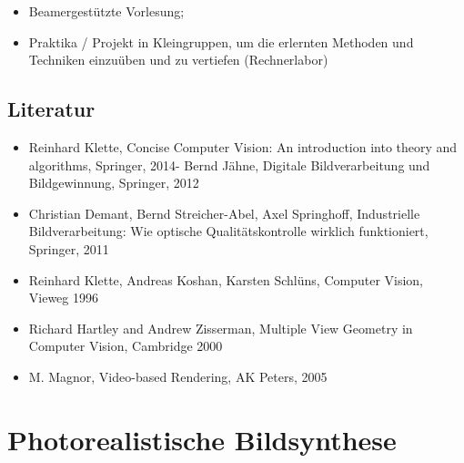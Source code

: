 \begin{itemize}
\tightlist
\item
  Beamergestützte Vorlesung;
\item
  Praktika / Projekt in Kleingruppen, um die erlernten Methoden und
  Techniken einzuüben und zu vertiefen (Rechnerlabor)
\end{itemize}

\section*{Literatur\label{/mi-2017/modulbeschreibungen-master/MA_VC_Modul_BildbasierteComputergrafik}}\label{literaturpathlabelmi-2017modulbeschreibungen-mastermaux5fvcux5fmodulux5fbildbasiertecomputergrafik}

\begin{itemize}
\tightlist
\item
  Reinhard Klette, Concise Computer Vision: An introduction into theory
  and algorithms, Springer, 2014- Bernd Jähne, Digitale Bildverarbeitung
  und Bildgewinnung, Springer, 2012
\item
  Christian Demant, Bernd Streicher-Abel, Axel Springhoff, Industrielle
  Bildverarbeitung: Wie optische Qualitätskontrolle wirklich
  funktioniert, Springer, 2011
\item
  Reinhard Klette, Andreas Koshan, Karsten Schlüns, Computer Vision,
  Vieweg 1996
\item
  Richard Hartley and Andrew Zisserman, Multiple View Geometry in
  Computer Vision, Cambridge 2000
\item
  M. Magnor, Video-based Rendering, AK Peters, 2005
\end{itemize}

\chapter{Photorealistische
Bildsynthese\label{/mi-2017/modulbeschreibungen-master/MA_VC_Modul_PhotorealistischeBildsynthese}}\label{photorealistische-bildsynthesepathlabelmi-2017modulbeschreibungen-mastermaux5fvcux5fmodulux5fphotorealistischebildsynthese}

